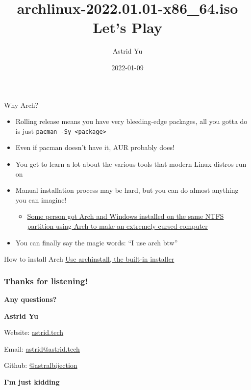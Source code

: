\documentclass{beamer}
\title{archlinux-2022.01.01-x86\_64.iso Let's Play}
\author{Astrid Yu}
\institute{Cal Poly Linux Users Group}
\date{2022-01-09}
\begin{document}
\frame{\titlepage}

\begin{frame}{Why Arch?}
    \begin{itemize}
        \item Rolling release means you have very bleeding-edge packages, all you gotta do is just \texttt{pacman -Sy <package>}
        \item Even if pacman doesn't have it, AUR probably does!
        \item You get to learn a lot about the various tools that modern Linux distros run on
        \item Manual installation process may be hard, but you can do almost anything you can imagine!
            \begin{itemize}
                \item \href{https://gist.github.com/motorailgun/cc2c573f253d0893f429a165b5f851ee}{Some person got Arch and Windows installed on the same NTFS partition using Arch to make an extremely cursed computer}
            \end{itemize} \pause
        \item You can finally say the magic words: ``I use arch btw''
    \end{itemize}
\end{frame}

\begin{frame}{How to install Arch}
    \Huge
    \href{https://wiki.archlinux.org/title/Archinstall}{Use archinstall, the built-in installer}
\end{frame}

\newcommand{\thankyouframe}{
    \frametitle{Thanks for listening!}
    
    {\Huge \textbf{Any questions?}}

    \vspace{1cm}

    {\large \textbf{Astrid Yu}}

    Website: \href{https://astrid.tech}{astrid.tech}

    Email: \href{mailto:astrid@astrid.tech}{astrid@astrid.tech}
    
    Github: \href{https://github.com/astralbijection}{@astralbijection}
}

\begin{frame}
    \thankyouframe \pause

    \centering
    \huge
    \textbf{I'm just kidding}
\end{frame}
\end{document}
